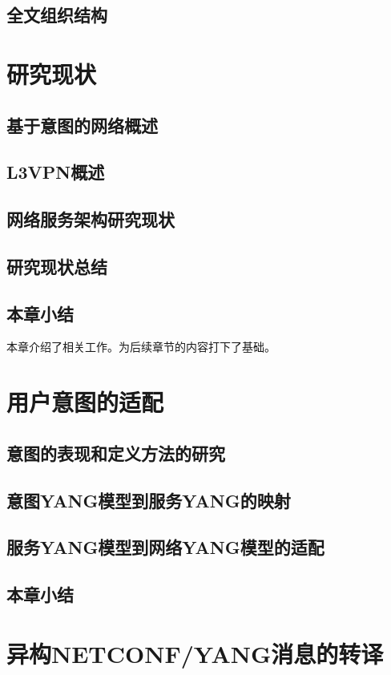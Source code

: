 \documentclass[algorithmlist, figurelist,tablelist, nomlist,engineering]{seuthesix}
\begin{document}
\section{全文组织结构}



\chapter{研究现状}

\section{基于意图的网络概述}
\section{L3VPN概述}
\section{网络服务架构研究现状}
\section{研究现状总结}
\section{本章小结}
本章介绍了相关工作。为后续章节的内容打下了基础。

\chapter{用户意图的适配}
\section{意图的表现和定义方法的研究}
\section{意图YANG模型到服务YANG的映射}
\section{服务YANG模型到网络YANG模型的适配}
\section{本章小结}

\chapter{异构NETCONF/YANG消息的转译}
\end{document}
